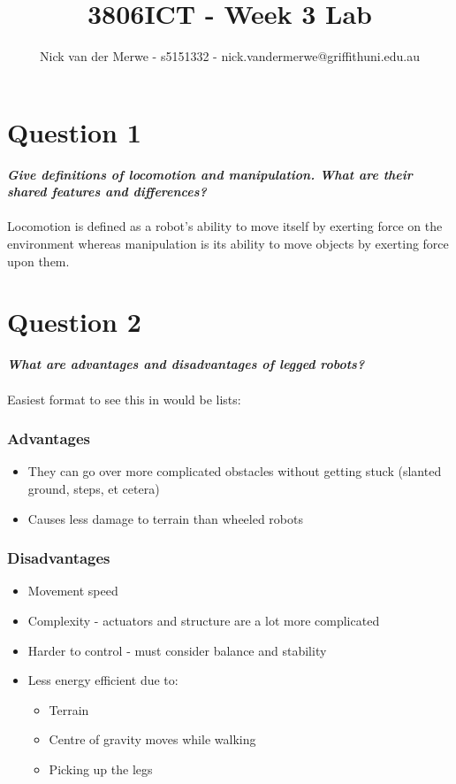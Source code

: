 \documentclass{article}
\title{3806ICT - Week 3 Lab}
\author{Nick van der Merwe - s5151332 - nick.vandermerwe@griffithuni.edu.au}
\newcommand\tab[1][1cm]{\hspace*{#1}}
\begin{document}
\maketitle

\section*{Question 1}
\textbf{\textit{
    \tab Give  definitions  of  locomotion  and  manipulation.  What  are  their shared features and differences?  
}} \\ \\
Locomotion is defined as a robot's ability to move itself by exerting force on 
the environment whereas manipulation is its ability to move objects by 
exerting force upon them.
\section*{Question 2}
\textbf{\textit{
    \tab What are advantages and disadvantages of legged robots?
}} \\ \\
Easiest format to see this in would be lists:
\subsubsection*{Advantages}
\begin{itemize}
    \item They can go over more complicated obstacles without 
        getting stuck (slanted ground, steps, et cetera)
    \item Causes less damage to terrain than wheeled robots
\end{itemize}
\subsubsection*{Disadvantages}
\begin{itemize}
    \item Movement speed
    \item Complexity - actuators and structure are a lot more complicated
    \item Harder to control - must consider balance and stability
    \item Less energy efficient due to:
    \begin{itemize}
        \item Terrain
        \item Centre of gravity moves while walking
        \item Picking up the legs
    \end{itemize}
\end{itemize}
\end{document}
